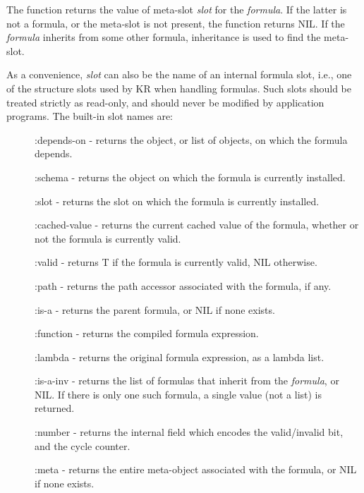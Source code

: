 The function returns the value of meta-slot {\it slot} for the {\it formula}.
If the latter is not a formula, or the meta-slot is not present, the
function returns NIL.  If the {\it formula} inherits from some other
formula, inheritance is used to find the meta-slot.

\begin{group}
As a convenience, {\it slot} can also be the name of an internal formula
slot, i.e., one of the structure slots used by KR when handling
formulas.  Such slots should be treated strictly as read-only, and should never
be modified by application programs.  The built-in slot names are:

\begin{description}
\item[] {\sc :depends-on} - returns the object, or list of objects, on which the
formula depends.

\item[] {\sc :schema} - returns the object on which the formula is currently installed.

\item[] {\sc :slot} - returns the slot on which the formula is currently installed.

\item[] {\sc :cached-value} - returns the current cached value of the formula,
whether or not the formula is currently valid.

\item[] {\sc :valid} - returns T if the formula is currently valid, NIL otherwise.

\item[] {\sc :path} - returns the path accessor associated with the formula, if any.

\item[] {\sc :is-a} - returns the parent formula, or NIL if none exists.

\item[] {\sc :function} - returns the compiled formula expression.

\item[] {\sc :lambda} - returns the original formula expression, as a lambda list.

\item[] {\sc :is-a-inv} - returns the list of formulas that inherit from the
{\it formula}, or NIL.  If there is only one such formula, a single value
(not a list) is returned.

\item[] {\sc :number} - returns the internal field which encodes the valid/invalid
bit, and the cycle counter.

\item[] {\sc :meta} - returns the entire meta-object associated with the formula, or
NIL if none exists.
\end{description}
\end{group}
\vspace{1 line}

